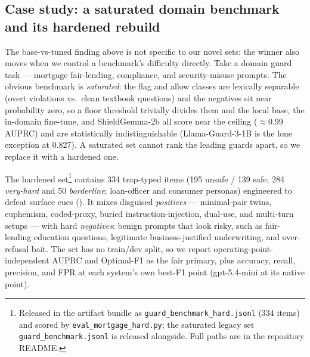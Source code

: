 \documentclass[sigconf,nonacm]{acmart}
\begin{document}
\subsection{Case study: a saturated domain benchmark and its hardened rebuild}
\label{sec:mortgage-casestudy}

The base-vs-tuned finding above is not specific to our novel sets: the winner also moves when we control a benchmark's difficulty directly. Take a domain guard task --- mortgage fair-lending, compliance, and security-misuse prompts. The obvious benchmark is \emph{saturated}: the flag and allow classes are lexically separable (overt violations vs.\ clean textbook questions) and the negatives sit near probability zero, so a floor threshold trivially divides them and the local base, the in-domain fine-tune, and ShieldGemma-2b all score near the ceiling ($\approx$0.99 AUPRC) and are statistically indistinguishable (Llama-Guard-3-1B is the lone exception at 0.827). A saturated set cannot rank the leading guards apart, so we replace it with a hardened one.

The hardened set\footnote{Released in the artifact bundle as \texttt{guard\_benchmark\_hard.jsonl} (334 items) and scored by \texttt{eval\_mortgage\_hard.py}; the saturated legacy set \texttt{guard\_benchmark.jsonl} is released alongside. Full paths are in the repository README.} contains 334 trap-typed items (195 unsafe / 139 safe; 284 \emph{very-hard} and 50 \emph{borderline}; loan-officer and consumer personas) engineered to defeat surface cues (). It mixes disguised \emph{positives} --- minimal-pair twins, euphemism, coded-proxy, buried instruction-injection, dual-use, and multi-turn setups --- with hard \emph{negatives}: benign prompts that look risky, such as fair-lending education questions, legitimate business-justified underwriting, and over-refusal bait. The set has no train/dev split, so we report operating-point-independent AUPRC and Optimal-F1 as the fair primary, plus accuracy, recall, precision, and FPR at each system's own best-F1 point (gpt-5.4-mini at its native point).
\end{document}
